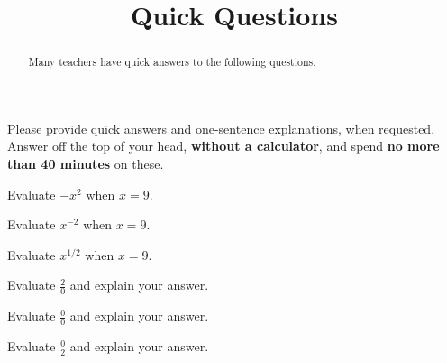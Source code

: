 \documentclass{ximera}
\title{Quick Questions}
\begin{document}
\begin{abstract}
Many teachers have quick answers to the following questions.  
\end{abstract}
\maketitle

Please provide quick answers and one-sentence explanations, when requested.  Answer off the top of your head, \textbf{without a calculator}, and spend \textbf{no more than 40 minutes} on these. 

%
%

\begin{question}
Evaluate $-x^2$ when $x=9$.
\begin{freeResponse}
\end{freeResponse}
\end{question}

\begin{question}
Evaluate $x^{-2}$ when $x=9$.
\begin{freeResponse}
\end{freeResponse}
\end{question}

\begin{question}
Evaluate $x^{1/2}$ when $x=9$.
\begin{freeResponse}
\end{freeResponse}
\end{question}

\begin{question}
Evaluate $\frac{2}{0}$ and explain your answer. 
\begin{freeResponse}
\end{freeResponse}
\end{question}

\begin{question}
Evaluate $\frac{0}{0}$ and explain your answer. 
\begin{freeResponse}
\end{freeResponse}
\end{question}

\begin{question}
Evaluate $\frac{0}{2}$ and explain your answer. 
\begin{freeResponse}
\end{freeResponse}
\end{question}
\end{document}
